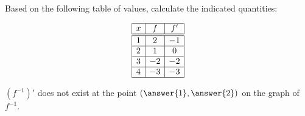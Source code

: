 \documentclass{ximera}
\author{Steven Gubkin}
\begin{document}
\begin{exercise}



Based on the following table of values, calculate the indicated quantities:

 \[
  \begin{array}{|c|c|c|}\hline
    x & f  & f' \\ \hline \hline
    1 & 2 & -1 \\ \hline
    2 & 1  & 0  \\ \hline
    3 & -2  & -2 \\ \hline
    4 & -3 & -3  \\ \hline
  \end{array}
  \]

$(f^{-1})'$ does not exist at the point $(\answer{1},\answer{2})$ on the graph of $f^{-1}$.

\end{exercise}
\end{document}
